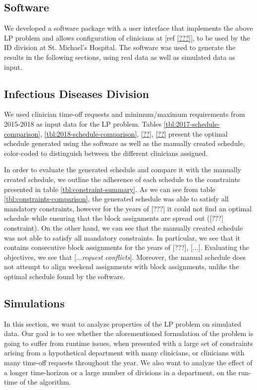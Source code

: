 \subsection{Software}
We developed a software package with a user interface that implements the above LP problem and allows configuration of clinicians at [ref \ref{???}], to be used by the ID division at St. Michael's Hospital. The software was used to generate the results in the following sections, using real data as well as simulated data as input.

\subsection{Infectious Diseases Division}
We used clinician time-off requests and minimum/maximum requirements from 2015-2018 as input data for the LP problem. Tables \ref{tbl:2017-schedule-comparison}, \ref{tbl:2018-schedule-comparison}, \ref{??}, \ref{??} present the optimal schedule generated using the software as well as the manually created schedule, color-coded to distinguish between the different clinicians assigned.




In order to evaluate the generated schedule and compare it with the manually created schedule, we outline the adherence of each schedule to the constraints presented in table \ref{tbl:constraint-summary}. As we can see from table \ref{tbl:constraints-comparison}, the generated schedule was able to satisfy all mandatory constraints, however for the years of [???] it could not find an optimal schedule while ensuring that the block assignments are spread out ([???] constraint). On the other hand, we can see that the manually created schedule was not able to satisfy all mandatory constraints. In particular, we see that it contains consecutive block assignments for the years of [???], [...]. Evaluating the objectives, we see that [...\textit{request conflicts}]. Moreover, the manual schedule does not attempt to align weekend assignments with block assignments, unlike the optimal schedule found by the software.



\subsection{Simulations}
In this section, we want to analyze properties of the LP problem on simulated data. Our goal is to see whether the aforementioned formulation of the problem is going to suffer from runtime issues, when presented with a large set of constraints arising from a hypothetical department with many clinicians, or clinicians with many time-off requests throughout the year. We also want to analyze the effect of a longer time-horizon or a large number of divisions in a department, on the run-time of the algorithm. \\

